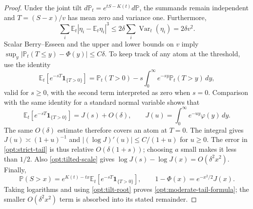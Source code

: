 \documentclass[11pt,a4paper]{article}
\theoremstyle{remark}
\newcommand{\E}{\mathbb E}
\newcommand{\Pp}{\mathbb P}
\newcommand{\Var}{\operatorname{Var}}
\newcommand{\ind}{\mathbf 1}
\begin{document}
\begin{proof}
Under the joint tilt
\(d\Pp_t=e^{tS-K(t)}d\Pp\), the summands remain independent and
\(T=(S-x)/v\) has mean zero and variance one. Furthermore,
\[
 \sum_i\E_t|\eta_i-\E_t\eta_i|^3
 \le2\delta\sum_i\Var_t(\eta_i)=2\delta v^2.
\]
Scalar Berry--Esseen and the upper and lower bounds on \(v\) imply
\(\sup_y|\Pp_t(T\le y)-\Phi(y)|\le C\delta\).
To keep track of any atom at the threshold, use the identity
\[
 \E_t[e^{-sT}\ind_{\{T>0\}}]
 =\Pp_t(T>0)-s\int_0^\infty e^{-sy}\Pp_t(T>y)\,dy,
\]
valid for \(s\ge0\), with the second term interpreted as zero when
\(s=0\). Comparison with
the same identity for a standard normal variable shows that
\begin{equation}
 \E_t[e^{-sT}\ind_{\{T>0\}}]=J(s)+O(\delta),\qquad
 J(u)=\int_0^\infty e^{-uy}\varphi(y)\,dy.
 \label{opt:strict-tail}
\end{equation}
The same \(O(\delta)\) estimate therefore covers an atom at \(T=0\).
The integral gives \(J(u)\asymp(1+u)^{-1}\) and
\(|(\log J)'(u)|\le C/(1+u)\) for \(u\ge0\).
The error in \eqref{opt:strict-tail} is thus relative
\(O(\delta(1+s))\); choosing \(a\) small makes it less than \(1/2\).
Also \eqref{opt:tilted-scale} gives
\(\log J(s)-\log J(x)=O(\delta^2x^2)\).
Finally,
\[
 \Pp(S>x)=e^{K(t)-tx}\E_t[e^{-sT}\ind_{\{T>0\}}],\qquad
 1-\Phi(x)=e^{-x^2/2}J(x).
\]
Taking logarithms and using \eqref{opt:tilt-root} proves
\eqref{opt:moderate-tail-formula}; the smaller
\(O(\delta^2x^2)\) term is absorbed into its stated remainder.
\end{proof}
\end{document}
